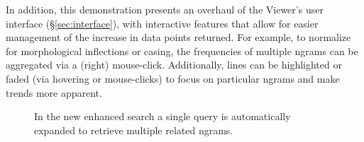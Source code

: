 \documentclass[11pt]{article}
\begin{document}
In addition, this demonstration presents an overhaul of the Viewer's user interface (\S\ref{sec:interface}), with interactive features that allow for easier management of the increase in data points returned. For example, to normalize for morphological inflections or casing, the frequencies of multiple ngrams can be aggregated via a (right) mouse-click. Additionally, lines can be highlighted or faded (via hovering or mouse-clicks) to focus on particular ngrams and make trends more apparent.


\begin{figure}
\centering
\addtolength{\subfigcapskip}{-0.2cm}
\hspace*{-0.5cm}
\hspace*{0.1cm}
\hspace*{0.1cm}
\hspace*{-0.5cm}\vspace*{-0.3cm}
\caption{\label{fig:examples}
In the new enhanced search a single query is automatically expanded to retrieve multiple related ngrams.\footnotemark{}}
\end{figure}

\end{document}
